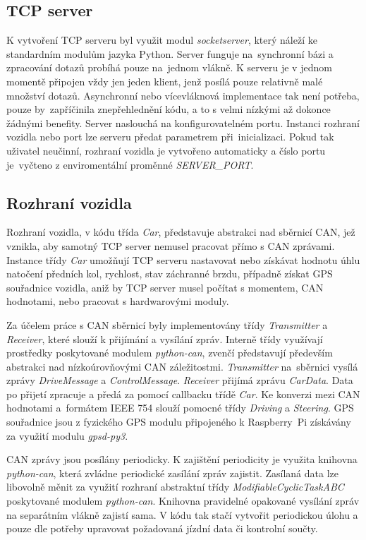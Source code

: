 \documentclass[czech, bachelor]{diploma}
\begin{document}
\subsection{TCP server}
K vytvoření TCP serveru byl využit modul \emph{socketserver}, který náleží ke standardním modulům jazyka Python. Server funguje
na~synchronní bázi a zpracování dotazů probíhá pouze na~jednom vlákně. K serveru je v jednom momentě připojen vždy jen jeden
klient, jenž posílá pouze relativně malé množství dotazů. Asynchronní nebo vícevláknová implementace tak není potřeba, pouze
by~zapříčinila znepřehlednění kódu, a to s velmi nízkými až dokonce žádnými benefity. Server naslouchá na konfigurovatelném portu.
Instanci rozhraní vozidla nebo port lze serveru předat parametrem při~inicializaci. Pokud tak uživatel neučinní, rozhraní vozidla
je vytvořeno automaticky a číslo portu je~vyčteno z enviromentální proměnné \emph{SERVER\_PORT}.

\subsection{Rozhraní vozidla}
Rozhraní vozidla, v kódu třída \emph{Car}, představuje abstrakci nad sběrnicí CAN, jež vznikla, aby samotný TCP server nemusel
pracovat přímo s CAN zprávami. Instance třídy \emph{Car} umožňují TCP serveru nastavovat nebo získávat hodnotu úhlu natočení
předních kol, rychlost, stav záchranné brzdu, případně získat GPS souřadnice vozidla, aniž by TCP server musel počítat s momentem,
CAN hodnotami, nebo pracovat s hardwarovými moduly.

Za účelem práce s CAN sběrnicí byly implementovány třídy \emph{Transmitter} a \emph{Receiver}, které slouží k přijímání a vysílání
zpráv. Interně třídy využívají prostředky poskytované modulem \emph{python-can}, zvenčí představují především abstrakci
nad nízkoúrovňovými CAN záležitostmi. \emph{Transmitter} na~sběrnici vysílá zprávy \emph{DriveMessage} a \emph{ControlMessage}.
\emph{Receiver} přijímá zprávu \emph{CarData}. Data po přijetí zpracuje a předá za pomocí callbacku třídě \emph{Car}. Ke konverzi
mezi CAN hodnotami a~formátem IEEE 754\cite{floating-point-source} slouží pomocné třídy \emph{Driving} a \emph{Steering}. GPS
souřadnice jsou z fyzického GPS modulu připojeného k Raspberry~Pi získávány za využití modulu \emph{gpsd-py3}.

CAN zprávy jsou posílány periodicky. K zajištění periodicity je využita knihovna \emph{python-can}, která zvládne periodické
zasílání zpráv zajistit. Zasílaná data lze libovolně měnit za využití rozhraní abstraktní třídy \emph{ModifiableCyclicTaskABC}
poskytované modulem \emph{python-can}. Knihovna pravidelné opakované vysílání zpráv na separátním vlákně zajistí sama. V kódu tak
stačí vytvořit periodickou úlohu a pouze dle potřeby upravovat požadovaná jízdní data či kontrolní součty.
\end{document}
